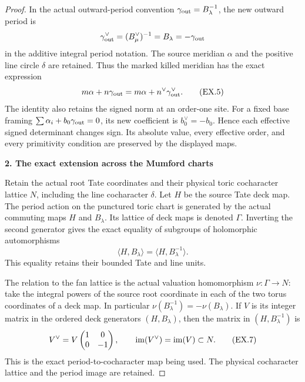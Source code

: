 \begin{proof}
In the actual outward-period convention
\(\gamma_{\rm out}=B_\lambda^{-1}\), the new outward period is
\[
 \gamma_{\rm out}^\vee=(B^\vee_\mu)^{-1}
             =B_\lambda=-\gamma_{\rm out}
\]
in the additive integral period notation. The source meridian
\(\alpha\) and the positive line circle \(\delta\) are retained.
Thus the marked killed meridian has the exact expression
\[
 m\alpha+n\gamma_{\rm out}
       =m\alpha+n^\vee\gamma_{\rm out}^\vee.
 \tag{EX.5}
\]
The identity also retains the signed norm at an order-one site.
For a fixed base framing
\(\sum\alpha_i+b_0\gamma_{\rm out}=0\), its new coefficient is
\(b_0^\vee=-b_0\). Hence each effective signed determinant changes
sign. Its absolute value, every effective order, and every
primitivity condition are preserved by the displayed maps.

\par

\medskip\noindent\textbf{2. The exact extension across the Mumford charts}

\par\nobreak

Retain the actual root Tate coordinates and their physical
toric cocharacter lattice \(N\), including the line cocharacter
\(\delta\). Let \(H\) be the source Tate deck map. The period
action on the punctured toric chart is generated by the actual
commuting maps \(H\) and \(B_\lambda\). Its lattice of deck
maps is denoted \(\Gamma\). Inverting the second generator gives
the exact equality of subgroups of holomorphic automorphisms
\[
 \langle H,B_\lambda\rangle
       =\langle H,B_\lambda^{-1}\rangle.
 \tag{EX.6}
\]
This equality retains their bounded Tate and line units.

The relation to the fan lattice is the actual valuation
homomorphism \(\nu:\Gamma\to N\): take the integral powers
of the source root coordinate in each of the two torus
coordinates of a deck map. In particular
\(\nu(B_\lambda^{-1})=-\nu(B_\lambda)\). If \(V\) is its
integer matrix in the ordered deck generators \((H,B_\lambda)\),
then the matrix in \((H,B_\lambda^{-1})\) is
\[
 V^\vee=V
       \begin{pmatrix}1&0\\0&-1\end{pmatrix},
 \qquad {\rm im}(V^\vee)={\rm im}(V)\subset N.
 \tag{EX.7}
\]
This is the exact period-to-cocharacter map being used.
The physical cocharacter lattice and the period image are
retained.


\end{proof}
